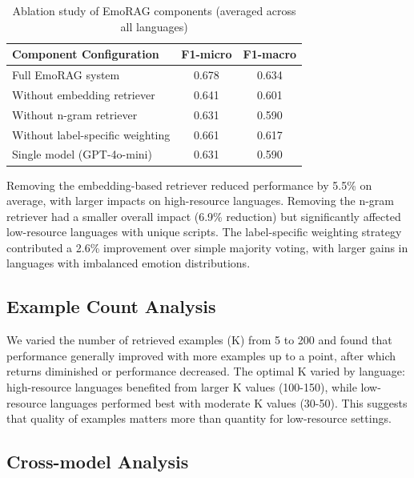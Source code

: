\documentclass[a4paper,12pt]{extarticle}
\begin{document}
\begin{table}[h]
\centering
\begin{tabular}{lcc}
\toprule
\textbf{Component Configuration} & \textbf{F1-micro} & \textbf{F1-macro} \\
\midrule
Full EmoRAG system & 0.678 & 0.634 \\
Without embedding retriever & 0.641 & 0.601 \\
Without n-gram retriever & 0.631 & 0.590 \\
Without label-specific weighting & 0.661 & 0.617 \\
Single model (GPT-4o-mini) & 0.631 & 0.590 \\
\bottomrule
\end{tabular}
\caption{Ablation study of EmoRAG components (averaged across all languages)}
\label{tab:ablation_components}
\end{table}

Removing the embedding-based retriever reduced performance by 5.5\% on average, with larger impacts on high-resource languages. Removing the n-gram retriever had a smaller overall impact (6.9\% reduction) but significantly affected low-resource languages with unique scripts. The label-specific weighting strategy contributed a 2.6\% improvement over simple majority voting, with larger gains in languages with imbalanced emotion distributions.

\subsection{Example Count Analysis}


We varied the number of retrieved examples (K) from 5 to 200 and found that performance generally improved with more examples up to a point, after which returns diminished or performance decreased. The optimal K varied by language: high-resource languages benefited from larger K values (100-150), while low-resource languages performed best with moderate K values (30-50). This suggests that quality of examples matters more than quantity for low-resource settings.

\subsection{Cross-model Analysis}
\end{document}
